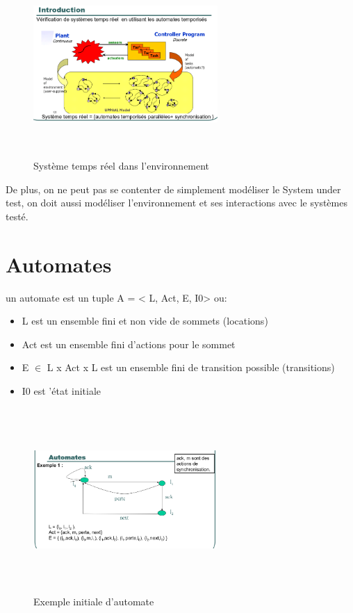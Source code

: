 \documentclass[oneside]{book}
\begin{document}
    \begin{figure}[!ht]
    	\centering
    	\includegraphics[width = 7cm, height = 7cm, keepaspectratio]{Images/rtsys_environnement.png}
    	\caption{Système temps réel dans l'environnement}
    	\label{fig:RTSYSInEnv}
    \end{figure}
    
    De plus, on ne peut pas se contenter de simplement modéliser le System under test, on doit aussi modéliser l'environnement et ses interactions avec le systèmes testé.\\
    
    \section{Automates}
    un automate est un tuple A = < L, Act, E, I0> ou:
    \begin{itemize}
        \item L est un ensemble fini et non vide de sommets (locations)
        \item Act est un ensemble fini d'actions pour le sommet
        \item E $\in$ L x Act x L est un ensemble fini de transition possible (transitions)
        \item I0 est 'état initiale
    \end{itemize}

    \begin{figure}[!ht]
    	\centering
    	\includegraphics[width = 7cm, height = 7cm, keepaspectratio]{Images/automate_simple.png}
    	\caption{Exemple initiale d'automate}
    	\label{fig:AutomateSimple}
    \end{figure}
    
\end{document}
